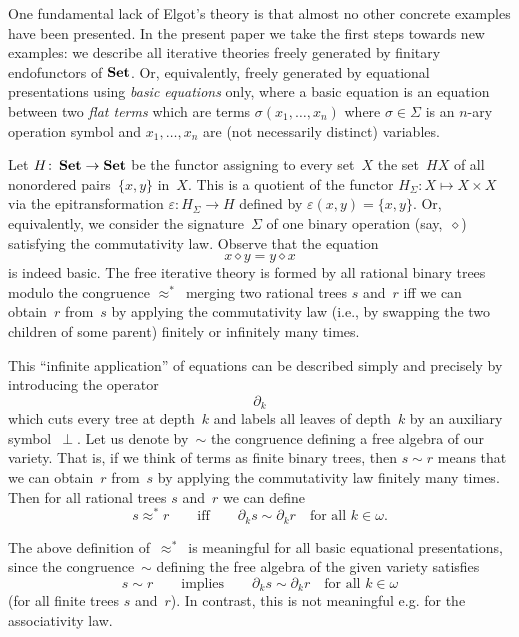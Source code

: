 \documentclass{entcs}
\newcommand{\Set}{\ensuremath{\St}}
\newcommand{\aps}{\ensuremath{\mathrel{\approx^*}}}
\DeclareMathOperator{\St}{\textnormal{\textbf{Set}}}
\newenvironment{pv}[1]{\begin{trivlist}
\item[\hspace{\labelsep}\normalfont\bfseries#1]}%
{\end{trivlist}}
\begin{document}
One fundamental lack of Elgot's theory is that almost no other
concrete examples have been presented. In the
present paper we take the first steps towards new examples: we
describe all iterative theories freely generated by finitary
endofunctors of \Set. Or, equivalently, freely generated by
equational presentations using \textit{basic equations} only, where
a basic equation is an equation between two \textit{flat terms}
which are terms $\sigma(x_1,\dots,x_n)$ where $\sigma\in\Sigma$ is
an $n$-ary operation symbol and $x_1,\dots,x_n$ are (not necessarily
distinct) variables.

\begin{pv}{1.1 Example}
Let $H\colon\Set\to\Set$
be the functor assigning
to every set~$X$ the set~$HX$ of all nonordered
pairs~$\{x,y\}$ in~$X$. This is a quotient of the functor
$H_\Sigma\colon X\mapsto X\times X$ via the epitransformation
$\varepsilon\colon H_\Sigma\to H$ defined
by $\varepsilon(x,y)=\{x,y\}$. Or,
equivalently, we consider the signature~$\Sigma$ of one binary
operation (say,~$\diamond$) satisfying the commutativity law.
Observe that the equation
\[x\diamond y=y\diamond x\]
is indeed basic. The free iterative theory is formed by all
rational binary trees modulo the congruence \aps\ merging two
rational trees $s$ and~$r$ iff we can obtain~$r$ from~$s$ by
applying the commutativity law (i.e., by swapping the two children
of some parent) finitely or infinitely many times.

This ``infinite application'' of equations can be described simply
and precisely by introducing the operator
\[\partial_k\]
which cuts every tree at depth~$k$ and labels all leaves of
depth~$k$ by an auxiliary symbol~$\perp$. Let us denote by~$\sim$
the congruence defining a free algebra of our variety. That is, if
we think of terms as finite binary trees, then $s\sim r$ means that
we can obtain~$r$ from~$s$ by applying the commutativity law
finitely many times. Then for all rational trees $s$ and~$r$ we can
define
\[s\aps r\qquad\text{iff}\qquad \partial_ks\sim\partial_kr\quad
\text{for all $k\in\omega$.}\]
\end{pv}

\begin{pv}{Remark}
The above definition of~\aps\ is meaningful for all basic equational
presentations, since the congruence~$\sim$ defining the free algebra
of the given variety satisfies
\[s\sim r\qquad\text{implies}\qquad \partial_ks\sim\partial_kr\quad
\text{for all $k\in\omega$}\]
(for all finite trees $s$ and~$r$). In contrast, this is not
meaningful e.g. for the associativity law.
\end{pv}
\end{document}
